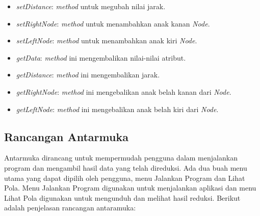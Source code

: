 \begin{itemize}
\begin{itemize}
\item \textit{setDistance}: \textit{method} untuk megubah nilai jarak.

\item \textit{setRightNode}: \textit{method} untuk menambahkan anak kanan \textit{Node}.

\item \textit{setLeftNode}: \textit{method} untuk menambahkan anak kiri \textit{Node}.

\item \textit{getData}: \textit{method} ini mengembalikan nilai-nilai atribut.

\item \textit{getDistance}: \textit{method} ini mengembalikan jarak.

\item \textit{getRightNode}: \textit{method} ini mengebalikan anak belah kanan dari \textit{Node}.

\item \textit{getLeftNode}: \textit{method} ini mengebalikan anak belah kiri dari \textit{Node}.

\end{itemize}


\end{itemize}


\subsection{Rancangan Antarmuka}

Antarmuka dirancang untuk mempermudah pengguna dalam menjalankan program dan mengambil hasil data yang telah direduksi. Ada dua buah menu utama yang dapat dipilih oleh pengguna, menu Jalankan Program dan Lihat Pola. Menu Jalankan Program digunakan untuk menjalankan aplikasi dan menu Lihat Pola digunakan untuk mengunduh dan melihat hasil reduksi. Berikut adalah penjelasan rancangan antaramuka:

